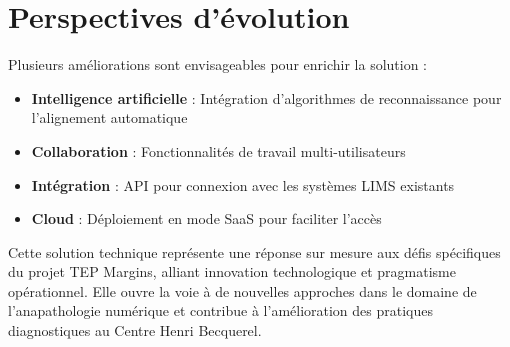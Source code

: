 \documentclass[11pt,a4paper]{report}
\begin{document}
\section{Perspectives d'évolution}

Plusieurs améliorations sont envisageables pour enrichir la solution :

\begin{itemize}
\item \textbf{Intelligence artificielle} : Intégration d'algorithmes de reconnaissance pour l'alignement automatique
\item \textbf{Collaboration} : Fonctionnalités de travail multi-utilisateurs
\item \textbf{Intégration} : API pour connexion avec les systèmes LIMS existants
\item \textbf{Cloud} : Déploiement en mode SaaS pour faciliter l'accès
\end{itemize}

Cette solution technique représente une réponse sur mesure aux défis spécifiques du projet TEP Margins, alliant innovation technologique et pragmatisme opérationnel. Elle ouvre la voie à de nouvelles approches dans le domaine de l'anapathologie numérique et contribue à l'amélioration des pratiques diagnostiques au Centre Henri Becquerel.
\end{document}
